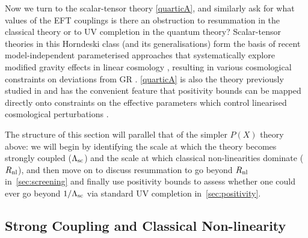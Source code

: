 \documentclass[11pt]{article}
\begin{document}
Now we turn to the scalar-tensor theory \eqref{quarticA}, and similarly ask for what values of the EFT couplings is there an obstruction to resummation in the classical theory or to UV completion in the quantum theory?  
Scalar-tensor theories in this Horndeski class (and its generalisations) form the basis of recent model-independent parameterised approaches that systematically explore modified gravity effects in linear cosmology  \cite{Gubitosi:2012hu,Bloomfield:2012ff,Gleyzes:2014rba,Bellini:2014fua,Gleyzes:2013ooa,Kase:2014cwa,DeFelice:2015isa,Langlois:2017mxy,Frusciante:2019xia,Renevey:2020tvr,Lagos:2016wyv,Lagos:2017hdr}, resulting in various cosmological constraints on deviations from GR \cite{Noller:2018wyv,Bellini:2014fua,Hu:2013twa,Raveri:2014cka,Gleyzes:2015rua,Kreisch:2017uet,Zumalacarregui:2016pph,Alonso:2016suf,Arai:2017hxj,Frusciante:2018jzw,Reischke:2018ooh,Mancini:2018qtb,Brando:2019xbv,Arjona:2019rfn,Raveri:2019mxg,Perenon:2019dpc,SpurioMancini:2019rxy,Baker:2020apq,Joudaki:2020shz,Noller:2020lav,Noller:2020afd}.
\eqref{quarticA} is also the theory previously studied in \cite{Melville:2019wyy, deRham:2021fpu} and has the convenient feature that positivity bounds can be mapped directly onto constraints on the effective parameters which control linearised cosmological perturbations \cite{Bellini:2014fua}. 

The structure of this section will parallel that of the simpler $P(X)$ theory above: we will begin by identifying the scale at which the theory becomes strongly coupled ($\Lambda_{\rm sc}$) and the scale at which classical non-linearities dominate ($R_{\rm nl}$), and then move on to discuss resummation to go beyond $R_{\rm nl}$ in~\ref{sec:screening} and finally use positivity bounds to assess whether one could ever go beyond $1/\Lambda_{\rm sc}$ via standard UV completion in~\ref{sec:positivity}. 


\subsection{Strong Coupling and Classical Non-linearity}
\label{sec:cutoff}
\end{document}
